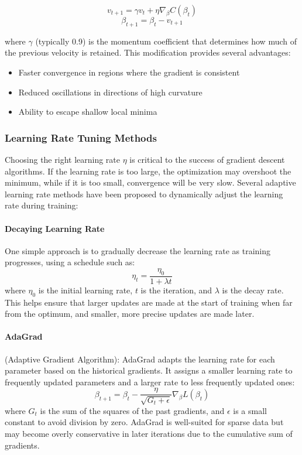 \documentclass[aps,pra,english,notitlepage,reprint,nofootinbib]{revtex4-1}  %
\begin{document}
\begin{equation}
    v_{t+1} = \gamma v_t + \eta \nabla_\beta C(\beta_t)
\end{equation}
\begin{equation}
    \beta_{t+1} = \beta_t - v_{t+1}
\end{equation}

where \( \gamma \) (typically 0.9) is the momentum coefficient that determines how much of the previous velocity is retained. This modification provides several advantages:
\begin{itemize}
    \item Faster convergence in regions where the gradient is consistent
    \item Reduced oscillations in directions of high curvature
    \item Ability to escape shallow local minima
\end{itemize}

\subsubsection{Learning Rate Tuning Methods}

Choosing the right learning rate \( \eta \) is critical to the success of gradient descent algorithms. If the learning rate is too large, the optimization may overshoot the minimum, while if it is too small, convergence will be very slow. Several adaptive learning rate methods have been proposed to dynamically adjust the learning rate during training:

\paragraph{Decaying Learning Rate}

 One simple approach is to gradually decrease the learning rate as training progresses, using a schedule such as:
  \[
  \eta_t = \frac{\eta_0}{1 + \lambda t}
  \]
  where \( \eta_0 \) is the initial learning rate, \( t \) is the iteration, and \( \lambda \) is the decay rate. This helps ensure that larger updates are made at the start of training when far from the optimum, and smaller, more precise updates are made later. \\

\paragraph{AdaGrad}
 (Adaptive Gradient Algorithm): AdaGrad adapts the learning rate for each parameter based on the historical gradients. It assigns a smaller learning rate to frequently updated parameters and a larger rate to less frequently updated ones:
  \[
  \beta_{t+1} = \beta_t - \frac{\eta}{\sqrt{G_t + \epsilon}} \nabla_\beta L(\beta_t)
  \]
  where \( G_t \) is the sum of the squares of the past gradients, and \( \epsilon \) is a small constant to avoid division by zero. AdaGrad is well-suited for sparse data but may become overly conservative in later iterations due to the cumulative sum of gradients. \\
\end{document}
